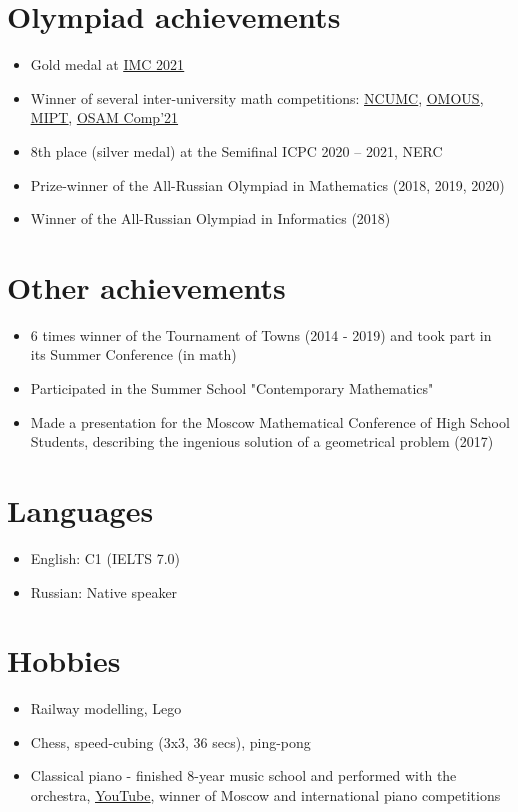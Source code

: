 \documentclass[letterpaper,11pt]{article}
\newcommand{\resumeItem}[1]{
    \item\small{
        {#1 \vspace{-2pt}}
    }
}
\newcommand{\resumeSubItem}[1]{\resumeItem{#1}\vspace{-4pt}}
\newcommand{\resumeItemListStart}{\begin{itemize}}
\newcommand{\resumeItemListEnd}{\end{itemize}\vspace{-5pt}}
\begin{document}
\vspace{-16pt}
\section{Olympiad achievements}
    \resumeItemListStart
        \resumeSubItem{Gold medal at \href{https://imc-math.org.uk/?year=2021}{\underline{IMC 2021}}}
        \resumeSubItem{Winner of several inter-university math competitions: \href{https://iuhd.edu.tm/competition/44}{\underline{NCUMC}}, \href{https://iuhd.edu.tm/competition/45}{\underline{OMOUS}}, \href{http://www.rkarasev.ru/note/66}{\underline{MIPT}}, \href{https://cs.hse.ru/en/announcements/504365867.html}{\underline{OSAM Comp'21}}}
        \resumeSubItem{8th place (silver medal) at the Semifinal ICPC 2020 – 2021, NERC}
        \resumeSubItem{Prize-winner of the All-Russian Olympiad in Mathematics (2018, 2019, 2020)}
        \resumeSubItem{Winner of the All-Russian Olympiad in Informatics (2018)}
    \resumeItemListEnd


\vspace{-8pt}
\section{Other achievements}
    \resumeItemListStart
        \resumeSubItem{6 times winner of the Tournament of Towns (2014 - 2019) and took part in its Summer Conference (in math)}
        \resumeSubItem{Participated in the Summer School "Contemporary Mathematics"}
        \resumeSubItem{Made a presentation for the Moscow Mathematical Conference of High School Students, describing the ingenious solution of a geometrical problem (2017)}
    \resumeItemListEnd


\section{Languages}
    \resumeItemListStart
        \resumeSubItem{English: C1 (IELTS 7.0)}
        \resumeSubItem{Russian: Native speaker}
    \resumeItemListEnd


\vspace{-8pt}
\section{Hobbies}
    \resumeItemListStart
        \resumeSubItem{Railway modelling, Lego}
        \resumeSubItem{Chess, speed-cubing (3x3, 36 secs), ping-pong}
        \resumeSubItem{Classical piano - finished 8-year music school and performed with the orchestra, \href{https://www.youtube.com/user/FeodorKuyanov/playlists}{\underline{YouTube}}, winner of Moscow and international piano competitions}
    \resumeItemListEnd
\end{document}
